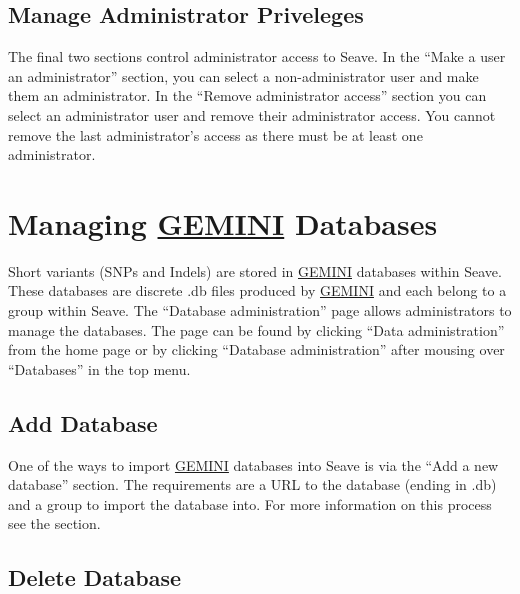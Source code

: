 \documentclass[11pt, a4paper]{article}
\newcommand{\GEMINI}{\href{https://gemini.readthedocs.io}{GEMINI} } %
\begin{document}

\subsection{Manage Administrator Priveleges}

The final two sections control administrator access to Seave. In the ``Make a user an administrator'' section, you can select a non-administrator user and make them an administrator. In the ``Remove administrator access'' section you can select an administrator user and remove their administrator access. You cannot remove the last administrator's access as there must be at least one administrator.


\section{Managing \GEMINI Databases}

Short variants (SNPs and Indels) are stored in \GEMINI databases within Seave. These databases are discrete .db files produced by \GEMINI and each belong to a group within Seave. The ``Database administration'' page allows administrators to manage the databases. The page can be found by clicking ``Data administration'' from the home page or by clicking ``Database administration'' after mousing over ``Databases'' in the top menu. 


\subsection{Add Database}

One of the ways to import \GEMINI databases into Seave is via the ``Add a new database'' section. The requirements are a URL to the database (ending in .db) and a group to import the database into. For more information on this process see the  section.


\subsection{Delete Database}
\end{document}
